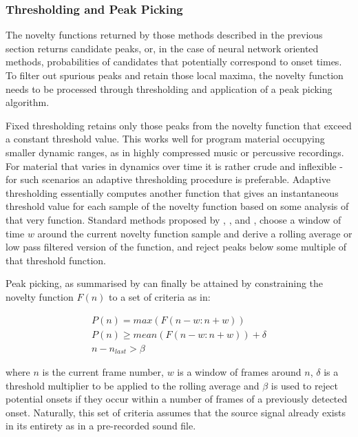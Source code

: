 \subsubsection{Thresholding and Peak Picking}
\label{sec:peak_picking}

The novelty functions returned by those methods described in the previous section returns candidate peaks, or, in the case of neural network oriented methods, probabilities of candidates that potentially correspond to onset times. To filter out spurious peaks and retain those local maxima, the novelty function needs to be processed through thresholding and application of a peak picking algorithm. 

Fixed thresholding retains only those peaks from the novelty function that exceed a constant threshold value. This works well for program material occupying smaller dynamic ranges, as in highly compressed music or percussive recordings. For material that varies in dynamics over time it is rather crude and inflexible - for such scenarios an adaptive thresholding procedure is preferable. Adaptive thresholding essentially computes another function that gives an instantaneous threshold value for each sample of the novelty function based on some analysis of that very function. Standard methods proposed by
\cite{Bello2005}, \cite{Dixon2006}, \cite{Bock2012a} and \cite{Bock2013}, choose a window of time $w$ around the current novelty function sample and derive a rolling average or low pass filtered version of the function, and reject peaks below some multiple of that threshold function.

Peak picking, as summarised by \cite{Bock2012a} can finally be attained by constraining the novelty function $F(n)$ to a set of criteria as in:

\begin{equation}
  \label{eq:peak_picking}
  \begin{gathered}
P(n)=max(F(n-w:n+w))\\
P(n)\geq mean(F(n-w:n+w))+\delta\\
n-n_{last}>\beta
  \end{gathered}
\end{equation}

where $n$ is the current frame number, $w$ is a window of frames around $n$, $\delta$ is a threshold multiplier to be applied to the rolling average and $\beta$ is used to reject potential onsets if they occur within a number of frames of a previously detected onset. Naturally, this set of criteria assumes that the source signal already exists in its entirety as in a pre-recorded sound file.

